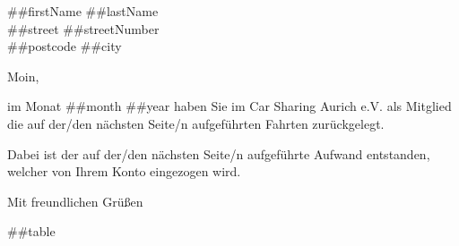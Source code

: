 \documentclass[%
    parskip=half,
    fromalign=right,  %
    fromphone=false, fromfax=false,
    fromrule=false]{scrlttr2}
\begin{document}
\begin{letter}{ ##firstName ##lastName \\ ##street ##streetNumber\\ ##postcode ##city } 

\opening{Moin,}

im Monat ##month ##year haben Sie im Car Sharing Aurich e.V. als Mitglied die auf der/den nächsten Seite/n aufgeführten Fahrten zurückgelegt.

Dabei ist der auf der/den nächsten Seite/n aufgeführte Aufwand entstanden, welcher von Ihrem Konto eingezogen wird.

\closing{Mit freundlichen Grüßen}


##table\\

\end{letter}
\end{document}
